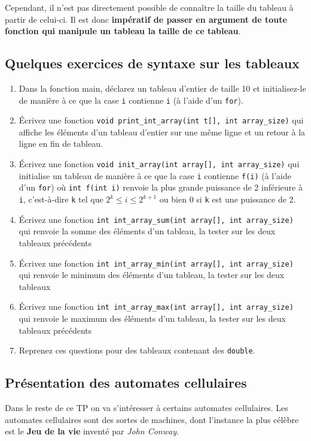 \documentclass[11pt]{article}
\begin{document}
Cependant, il n'est pas directement possible de connaître la taille du tableau à partir de celui-ci. Il est donc \textbf{impératif de passer en argument de toute fonction qui manipule un tableau la taille de ce tableau}.

\subsection{Quelques exercices de syntaxe sur les tableaux}
\label{sec:org370f63c}
\begin{enumerate}
\item Dans la fonction main, déclarez un tableau d'entier de taille 10 et initialisez-le de manière à ce que la case \texttt{i} contienne \texttt{i} (à l'aide d'un \texttt{for}).
\item Écrivez une fonction \texttt{void print\_int\_array(int t[], int array\_size)} qui affiche les éléments d'un tableau d'entier sur une même ligne et un retour à la ligne en fin de tableau.
\item Écrivez une fonction \texttt{void init\_array(int array[], int array\_size)} qui initialise un tableau de manière à ce que la case \texttt{i} contienne \texttt{f(i)} (à l'aide d'un \texttt{for}) où \texttt{int f(int i)} renvoie la plus grande puissance de 2 inférieure à \texttt{i}, c'est-à-dire \texttt{k} tel que \(2^k \leq i \leq 2^{k+1}\) ou bien 0 si \texttt{k} est une puissance de 2.
\item Écrivez une fonction \texttt{int int\_array\_sum(int array[], int array\_size)} qui renvoie la somme des éléments d'un tableau, la tester sur les deux tableaux précédents
\item Écrivez une fonction \texttt{int int\_array\_min(int array[], int array\_size)} qui renvoie le minimum des éléments d'un tableau, la tester sur les deux tableaux
\item Écrivez une fonction \texttt{int int\_array\_max(int array[], int array\_size)} qui renvoie le maximum des éléments d'un tableau, la tester sur les deux tableaux précédents
\item Reprenez ces questions pour des tableaux contenant des \texttt{double}.
\end{enumerate}
\subsection{Présentation des automates cellulaires}
\label{sec:org2faf62f}
Dans le reste de ce TP on va s'intéresser à certains automates cellulaires. Les automates cellulaires sont des sortes de machines, dont l'instance la plus célèbre est le \textbf{Jeu de la vie} inventé par \emph{John Conway}.
\end{document}
